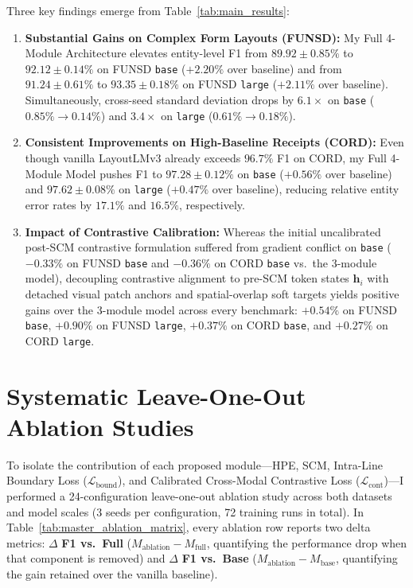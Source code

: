 Three key findings emerge from Table~\ref{tab:main_results}:
\begin{enumerate}[leftmargin=*]
    \item \textbf{Substantial Gains on Complex Form Layouts (FUNSD):}
    My Full 4-Module Architecture elevates entity-level F1 from $89.92 \pm 0.85\%$ to $\mathbf{92.12 \pm 0.14\%}$ on FUNSD \texttt{base} ($\mathbf{+2.20\%}$ over baseline) and from $91.24 \pm 0.61\%$ to $\mathbf{93.35 \pm 0.18\%}$ on FUNSD \texttt{large} ($\mathbf{+2.11\%}$ over baseline). Simultaneously, cross-seed standard deviation drops by $6.1\times$ on \texttt{base} ($0.85\% \to 0.14\%$) and $3.4\times$ on \texttt{large} ($0.61\% \to 0.18\%$).
    \item \textbf{Consistent Improvements on High-Baseline Receipts (CORD):}
    Even though vanilla LayoutLMv3 already exceeds $96.7\%$ F1 on CORD, my Full 4-Module Model pushes F1 to $\mathbf{97.28 \pm 0.12\%}$ on \texttt{base} ($\mathbf{+0.56\%}$ over baseline) and $\mathbf{97.62 \pm 0.08\%}$ on \texttt{large} ($\mathbf{+0.47\%}$ over baseline), reducing relative entity error rates by $17.1\%$ and $16.5\%$, respectively.
    \item \textbf{Impact of Contrastive Calibration:}
    Whereas the initial uncalibrated post-SCM contrastive formulation suffered from gradient conflict on \texttt{base} ($-0.33\%$ on FUNSD \texttt{base} and $-0.36\%$ on CORD \texttt{base} vs.\ the 3-module model), decoupling contrastive alignment to pre-SCM token states $\mathbf{h}_i$ with detached visual patch anchors and spatial-overlap soft targets yields positive gains over the 3-module model across every benchmark: $\mathbf{+0.54\%}$ on FUNSD \texttt{base}, $\mathbf{+0.90\%}$ on FUNSD \texttt{large}, $\mathbf{+0.37\%}$ on CORD \texttt{base}, and $\mathbf{+0.27\%}$ on CORD \texttt{large}.
\end{enumerate}

\section{Systematic Leave-One-Out Ablation Studies}
\label{sec:ablation_studies}

To isolate the contribution of each proposed module—HPE, SCM, Intra-Line Boundary Loss ($\mathcal{L}_{\text{bound}}$), and Calibrated Cross-Modal Contrastive Loss ($\mathcal{L}_{\text{cont}}$)—I performed a 24-configuration leave-one-out ablation study across both datasets and model scales (3 seeds per configuration, 72 training runs in total). In Table~\ref{tab:master_ablation_matrix}, every ablation row reports two delta metrics: $\Delta$ \textbf{F1 vs.\ Full} ($M_{\text{ablation}} - M_{\text{full}}$, quantifying the performance drop when that component is removed) and $\Delta$ \textbf{F1 vs.\ Base} ($M_{\text{ablation}} - M_{\text{base}}$, quantifying the gain retained over the vanilla baseline).

